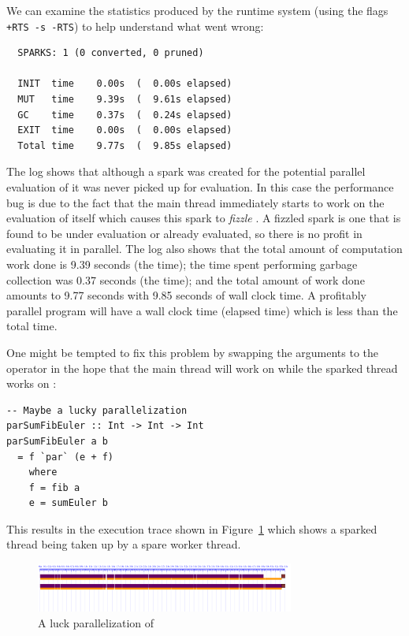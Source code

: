 We can examine the statistics produced by the runtime system (using
the flags \texttt{+RTS -s -RTS}) to help understand what went wrong:

\begin{verbatim}
  SPARKS: 1 (0 converted, 0 pruned)

  INIT  time    0.00s  (  0.00s elapsed)
  MUT   time    9.39s  (  9.61s elapsed)
  GC    time    0.37s  (  0.24s elapsed)
  EXIT  time    0.00s  (  0.00s elapsed)
  Total time    9.77s  (  9.85s elapsed)
\end{verbatim}

The log shows that although a spark was created for the potential
parallel evaluation of  it was never picked up for
evaluation. In this case the performance bug is due to the fact that
the main thread immediately starts to work on the evaluation of
 itself which causes this spark to \emph{fizzle}
\cite{mulitcore-ghc}.  A fizzled spark is one that is found to be
under evaluation or already evaluated, so there is no profit in
evaluating it in parallel. The log also shows that the total
amount of computation work done is 9.39 seconds (the  time); the time spent performing garbage collection was 0.37 seconds (the  time); and the total amount of work done amounts to 9.77 seconds with 9.85 seconds of wall clock time. A profitably parallel program will have a wall clock time (elapsed time) which is less than the total time.

One might be tempted to fix this problem by swapping the arguments to
the \codef{+} operator in the hope that the main thread will work on
 while the sparked thread works on :

\begin{lstlisting}
-- Maybe a lucky parallelization
parSumFibEuler :: Int -> Int -> Int
parSumFibEuler a b
  = f `par` (e + f)
    where
    f = fib a
    e = sumEuler b
\end{lstlisting}

This results in the execution trace shown in Figure~\ref{f:lucky} which shows a sparked thread being taken up by a spare worker thread. 

\begin{figure}
\begin{center}
\includegraphics[width=8.5cm]{SumEuler2-N2-eventlog.pdf}
\end{center}
\caption{A luck parallelization of }
\label{f:lucky}
\end{figure}

